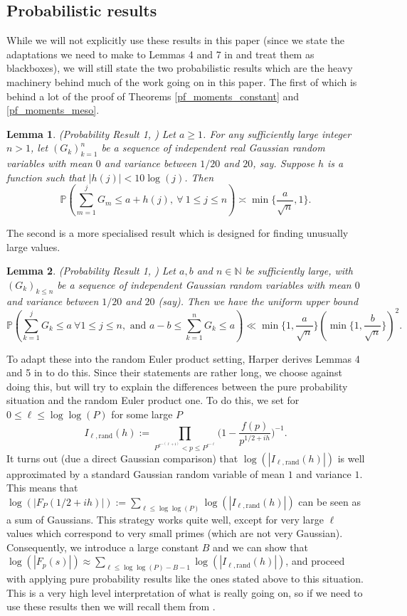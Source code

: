 \documentclass[reqno]{amsart}
\newtheorem{lemma}{Lemma}
\theoremstyle{definition}
\theoremstyle{remark}
\numberwithin{equation}{section}
\theoremstyle{remark}
\newcommand{\Prob}{\mathbb{P}}
\begin{document}
\subsection{Probabilistic results} \label{prob_heur}
While we will not explicitly use these results in this paper (since we state the adaptations we need to make to Lemmas 4 and 7 in \cite{harper2019partition} and treat them as blackboxes), we will still state the two probabilistic results which are the heavy machinery behind much of the work going on in this paper. The first of which is behind a lot of the proof of Theorems \ref{pf_moments_constant} and \ref{pf_moments_meso}.
\begin{lemma}
    (Probability Result 1, \cite{aharper201}) Let $a\geqslant 1$. For any sufficiently large integer $n > 1$, let $(G_k)_{k=1}^n$ be a sequence of independent real Gaussian random variables with mean $0$ and variance between $1/20$ and $20$, say. Suppose $h$ is a function such that $|h(j)| < 10\log(j)$. Then
    $$\Prob(\sum_{m=1}^j G_m \leqslant a + h(j),  \ \forall \ 1 \leqslant j \leqslant n ) \asymp \min\big\{\frac{a}{\sqrt{n}},1\big\}.$$ \label{ballot}
\end{lemma}
The second is a more specialised result which is designed for finding unusually large values.
\begin{lemma}
    (Probability Result 1, \cite{harper2019partition}) Let $a,b$ and $n \in \mathbb{N}$ be sufficiently large, with $(G_k)_{k \leq n}$ be a sequence of independent Gaussian random variables with mean $0$ and variance between $1/20$ and $20$ (say). Then we have the uniform upper bound
    $$\mathbb{P}(\sum_{k=1}^jG_k \leq a \ \forall1 \leq j \leq n, \text{ and } a-b \leq \sum_{k=1}^nG_k \leq a) \ll \min\big\{1,\frac{a}{\sqrt{n}}\big\}(\min\big\{1,\frac{b}{\sqrt{n}}\big\})^2.$$
\end{lemma}
To adapt these into the random Euler product setting, Harper derives Lemmas 4 and 5 in \cite{aharper201} to do this. Since their statements are rather long, we choose against doing this, but will try to explain the differences between the pure probability situation and the random Euler product one. To do this, we set for $0 \leq \ell \leq \log\log(P)$ for some large $P$
$$I_{\ell,\text{rand}}(h):=\prod_{P^{e^{-(\ell+1)}}< p \leq P^{e^{-\ell}}}\big(1-\frac{f(p)}{p^{1/2+ih}}\big)^{-1}.$$
It turns out (due a direct Gaussian comparison) that $\log(|I_{\ell,\text{rand}}(h)|)$ is well approximated by a standard Gaussian random variable of mean $1$ and variance $1$. This means that $\log(|F_P(1/2+ih)|) := \sum_{\ell \leq \log\log(P)}\log(|I_{\ell,\text{rand}}(h)|)$ can be seen as a sum of Gaussians. This strategy works quite well, except for very large $\ell$ values which correspond to very small primes (which are not very Gaussian). Consequently, we introduce a large constant $B$ and we can show that $\log(|F_p(s)|) \approx \sum_{\ell \leq \log\log(P)-B-1}\log(|I_{\ell,\text{rand}}(h)|)$, and proceed with applying pure probability results like the ones stated above to this situation. This is a very high level interpretation of what is really going on, so if we need to use these results then we will recall them from \cite{aharper201}.  
\end{document}
